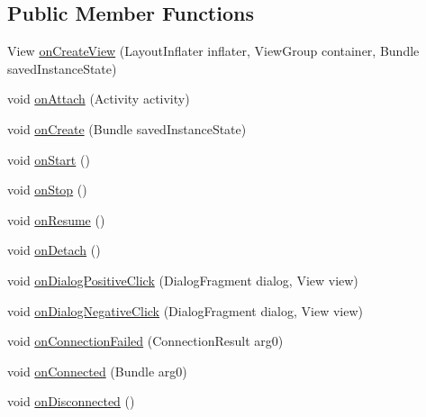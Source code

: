 \subsection*{Public Member Functions}
\begin{DoxyCompactItemize}
\item 
View \hyperlink{classuk_1_1ac_1_1swan_1_1digitaltrails_1_1fragments_1_1_map_fragment_accdc9c431f216d3a03431166e3f30379}{on\+Create\+View} (Layout\+Inflater inflater, View\+Group container, Bundle saved\+Instance\+State)
\item 
void \hyperlink{classuk_1_1ac_1_1swan_1_1digitaltrails_1_1fragments_1_1_map_fragment_a6a6827601a5638cc3b97485ccdaf2c86}{on\+Attach} (Activity activity)
\item 
void \hyperlink{classuk_1_1ac_1_1swan_1_1digitaltrails_1_1fragments_1_1_map_fragment_a8f08a9164d00020e32e548275fb6adda}{on\+Create} (Bundle saved\+Instance\+State)
\item 
void \hyperlink{classuk_1_1ac_1_1swan_1_1digitaltrails_1_1fragments_1_1_map_fragment_acf60cc97f0903a4f54364d0ed20ded0a}{on\+Start} ()
\item 
void \hyperlink{classuk_1_1ac_1_1swan_1_1digitaltrails_1_1fragments_1_1_map_fragment_ae53e878189d7ffea07e78226f6fa3942}{on\+Stop} ()
\item 
void \hyperlink{classuk_1_1ac_1_1swan_1_1digitaltrails_1_1fragments_1_1_map_fragment_a7f0fb317a760690795c0d15d3d11455e}{on\+Resume} ()
\item 
void \hyperlink{classuk_1_1ac_1_1swan_1_1digitaltrails_1_1fragments_1_1_map_fragment_ab43bdfbec6736493961b1d8e24edc57f}{on\+Detach} ()
\item 
void \hyperlink{classuk_1_1ac_1_1swan_1_1digitaltrails_1_1fragments_1_1_map_fragment_aa25573f8e27a54fe101d91bd2d9e1132}{on\+Dialog\+Positive\+Click} (Dialog\+Fragment dialog, View view)
\item 
void \hyperlink{classuk_1_1ac_1_1swan_1_1digitaltrails_1_1fragments_1_1_map_fragment_a920e326c6b097efbd39d04d0f3a0207e}{on\+Dialog\+Negative\+Click} (Dialog\+Fragment dialog, View view)
\item 
void \hyperlink{classuk_1_1ac_1_1swan_1_1digitaltrails_1_1fragments_1_1_map_fragment_a1a6b97b8d21be5025954db4898188fbf}{on\+Connection\+Failed} (Connection\+Result arg0)
\item 
void \hyperlink{classuk_1_1ac_1_1swan_1_1digitaltrails_1_1fragments_1_1_map_fragment_a6f50aaa1a3e7a2455c69f6f2d637c5b0}{on\+Connected} (Bundle arg0)
\item 
void \hyperlink{classuk_1_1ac_1_1swan_1_1digitaltrails_1_1fragments_1_1_map_fragment_a3a70b590f6805f4cf0a2fef78655dd7f}{on\+Disconnected} ()

\end{DoxyCompactItemize}
